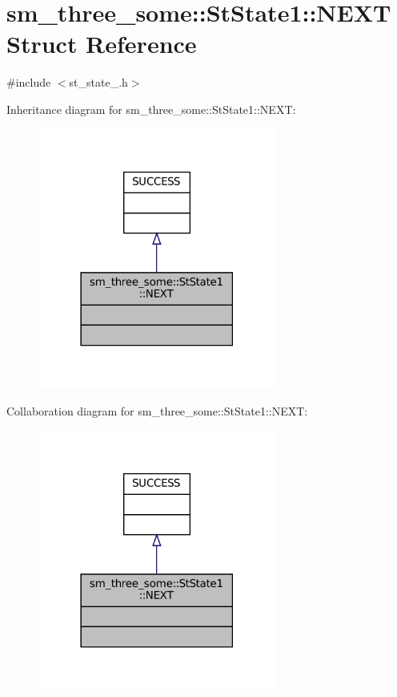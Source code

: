 \hypertarget{structsm__three__some_1_1StState1_1_1NEXT}{}\section{sm\+\_\+three\+\_\+some\+:\+:St\+State1\+:\+:N\+E\+XT Struct Reference}
\label{structsm__three__some_1_1StState1_1_1NEXT}


{\ttfamily \#include $<$st\+\_\+state\+\_.\+h$>$}



Inheritance diagram for sm\+\_\+three\+\_\+some\+:\+:St\+State1\+:\+:N\+E\+XT\+:
\nopagebreak
\begin{figure}[H]
\begin{center}
\leavevmode
\includegraphics[width=222pt]{structsm__three__some_1_1StState1_1_1NEXT__inherit__graph}
\end{center}
\end{figure}


Collaboration diagram for sm\+\_\+three\+\_\+some\+:\+:St\+State1\+:\+:N\+E\+XT\+:
\nopagebreak
\begin{figure}[H]
\begin{center}
\leavevmode
\includegraphics[width=222pt]{structsm__three__some_1_1StState1_1_1NEXT__coll__graph}
\end{center}
\end{figure}


